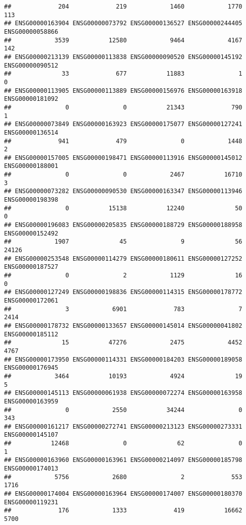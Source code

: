 \documentclass[
]{article}
\begin{document}
\begin{verbatim}
##             204             219            1460            1770             113 
## ENSG00000163904 ENSG00000073792 ENSG00000136527 ENSG00000244405 ENSG00000058866 
##            3539           12580            9464            4167             142 
## ENSG00000213139 ENSG00000113838 ENSG00000090520 ENSG00000145192 ENSG00000090512 
##              33             677           11883               1               0 
## ENSG00000113905 ENSG00000113889 ENSG00000156976 ENSG00000163918 ENSG00000181092 
##               0               0           21343             790               1 
## ENSG00000073849 ENSG00000163923 ENSG00000175077 ENSG00000127241 ENSG00000136514 
##             941             479               0            1448               2 
## ENSG00000157005 ENSG00000198471 ENSG00000113916 ENSG00000145012 ENSG00000188001 
##               0               0            2467           16710               3 
## ENSG00000073282 ENSG00000090530 ENSG00000163347 ENSG00000113946 ENSG00000198398 
##               0           15138           12240              50               0 
## ENSG00000196083 ENSG00000205835 ENSG00000188729 ENSG00000188958 ENSG00000152492 
##            1907              45               9              56           24126 
## ENSG00000253548 ENSG00000114279 ENSG00000180611 ENSG00000127252 ENSG00000187527 
##               0               2            1129              16               0 
## ENSG00000127249 ENSG00000198836 ENSG00000114315 ENSG00000178772 ENSG00000172061 
##               3            6901             783               7            2414 
## ENSG00000178732 ENSG00000133657 ENSG00000145014 ENSG00000041802 ENSG00000185112 
##              15           47276            2475            4452            4767 
## ENSG00000173950 ENSG00000114331 ENSG00000184203 ENSG00000189058 ENSG00000176945 
##            3464           10193            4924              19               5 
## ENSG00000145113 ENSG00000061938 ENSG00000072274 ENSG00000163958 ENSG00000163959 
##               0            2550           34244               0             343 
## ENSG00000161217 ENSG00000272741 ENSG00000213123 ENSG00000273331 ENSG00000145107 
##           12468               0              62               0               1 
## ENSG00000163960 ENSG00000163961 ENSG00000214097 ENSG00000185798 ENSG00000174013 
##            5756            2680               2             553            1716 
## ENSG00000174004 ENSG00000163964 ENSG00000174007 ENSG00000180370 ENSG00000119231 
##             176            1333             419           16662            5700 

\end{verbatim}
\end{document}
